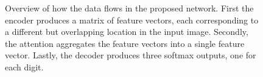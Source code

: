 
\begin{figure}
\centering



\caption{Overview of how the data flows in the proposed network. First the encoder produces a matrix of feature vectors, each corresponding to a different but overlapping location in the input image. Secondly, the attention aggregates the feature vectors into a single feature vector. Lastly, the decoder produces three softmax outputs, one for each digit.}
\label{fig:sys_overview}
\end{figure}

